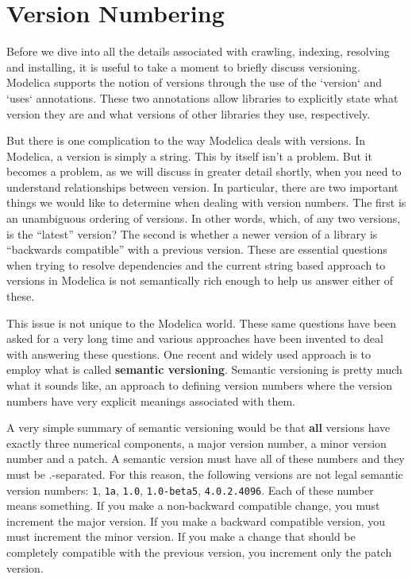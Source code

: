 \documentclass[11pt,a4paper,twocolumn]{article}
\newcommand{\code}[1]{\texttt{#1}} %
\begin{document}
\section{Version Numbering}
\label{sec:numbers}

Before we dive into all the details associated with crawling,
indexing, resolving and installing, it is useful to take a moment to
briefly discuss versioning.  Modelica supports the notion of versions
through the use of the `version` and `uses` annotations.  These two
annotations allow libraries to explicitly state what version they are
and what versions of other libraries they use, respectively.

But there is one complication to the way Modelica deals with versions.
In Modelica, a version is simply a string.  This by itself isn't a
problem.  But it becomes a problem, as we will discuss in greater
detail shortly, when you need to understand relationships between
version.  In particular, there are two important things we would like
to determine when dealing with version numbers.  The first is an
unambiguous ordering of versions.  In other words, which, of any two
versions, is the ``latest'' version?  The second is whether a newer
version of a library is ``backwards compatible'' with a previous
version.  These are essential questions when trying to resolve
dependencies and the current string based approach to versions in
Modelica is not semantically rich enough to help us answer either of
these.

This issue is not unique to the Modelica world.  These same questions
have been asked for a very long time and various approaches have been
invented to deal with answering these questions.  One recent and
widely used approach is to employ what is called {\bf semantic
  versioning}\cite{semver}.  Semantic versioning is pretty much what
it sounds like, an approach to defining version numbers where the
version numbers have very explicit meanings associated with them.

A very simple summary of semantic versioning would be that {\bf all}
versions have exactly three numerical components, a major version
number, a minor version number and a patch.  A semantic version must
have all of these numbers and they must be .-separated.  For this
reason, the following versions are not legal semantic version numbers:
\code{1}, \code{1a}, \code{1.0}, \code{1.0-beta5}, \code{4.0.2.4096}.
Each of these number means something.  If you make a non-backward
compatible change, you must increment the major version.  If you make
a backward compatible version, you must increment the minor version.
If you make a change that should be completely compatible with the
previous version, you increment only the patch version.
\end{document}
